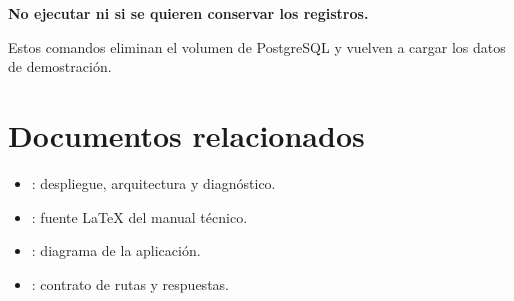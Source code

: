 \textbf{No ejecutar  ni  si se quieren conservar los registros.}

Estos comandos eliminan el volumen de PostgreSQL y vuelven a cargar los datos de demostración.

\section{Documentos relacionados}

\begin{itemize}
  \item {}: despliegue, arquitectura y diagnóstico.
  \item {}: fuente LaTeX del manual técnico.
  \item {}: diagrama de la aplicación.
  \item {}: contrato de rutas y respuestas.
\end{itemize}


